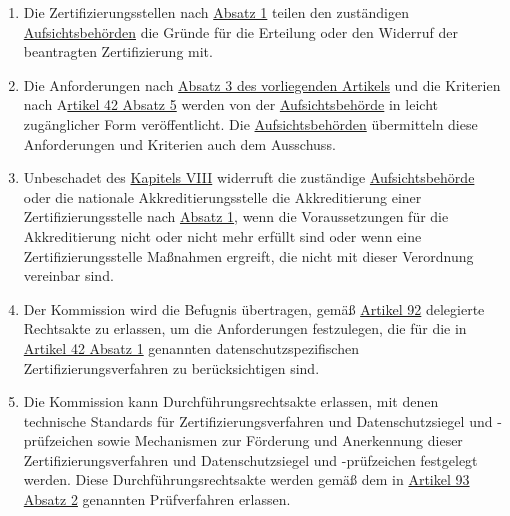 \begin{enumerate}
  \item Die Zertifizierungsstellen nach \hyperref[itm:43-1]{Absatz 1} teilen den zuständigen \hyperref[itm:04-21]
   {Aufsichtsbehörden} die Gründe für die Erteilung oder den Widerruf der beantragten Zertifizierung mit.%
  \label{itm:43-5}

  \item Die Anforderungen nach \hyperref[itm:43-3]{Absatz 3 des vorliegenden Artikels} und die Kriterien nach A\hyperref
   [itm:42-5]{rtikel 42 Absatz 5} werden von der \hyperref[itm:04-21]{Aufsichtsbehörde} in leicht zugänglicher Form
   veröffentlicht. Die
   \hyperref[itm:04-21]{Aufsichtsbehörden} übermitteln diese Anforderungen und Kriterien auch dem Ausschuss. %
  \label{itm:43-6}

  \item Unbeschadet des \hyperref[part:8]{Kapitels VIII} widerruft die zuständige \hyperref[itm:04-21]
   {Aufsichtsbehörde} oder die nationale Akkreditierungsstelle die Akkreditierung einer Zertifizierungsstelle
   nach \hyperref[itm:43-1]{Absatz 1}, wenn die Voraussetzungen für die Akkreditierung nicht oder nicht mehr erfüllt
   sind oder wenn eine Zertifizierungsstelle Maßnahmen ergreift, die nicht mit dieser Verordnung vereinbar sind.%
  \label{itm:43-7}

  \item Der Kommission wird die Befugnis übertragen, gemäß \hyperref[ch:92]{Artikel 92} delegierte Rechtsakte zu
   erlassen, um die Anforderungen festzulegen, die für die in \hyperref[itm:42-1]{Artikel 42 Absatz 1} genannten
   datenschutzspezifischen Zertifizierungsverfahren zu berücksichtigen sind.%
  \label{itm:43-8}

  \item Die Kommission kann Durchführungsrechtsakte erlassen, mit denen technische Standards für
   Zertifizierungsverfahren und Datenschutzsiegel und -prüfzeichen sowie Mechanismen zur Förderung und Anerkennung
   dieser Zertifizierungsverfahren und Datenschutzsiegel und -prüfzeichen festgelegt werden. Diese
   Durchführungsrechtsakte werden gemäß dem in \hyperref[itm:93-2]{Artikel 93 Absatz 2} genannten Prüfverfahren
   erlassen.%
  \label{itm:43-9}

\end{enumerate}


